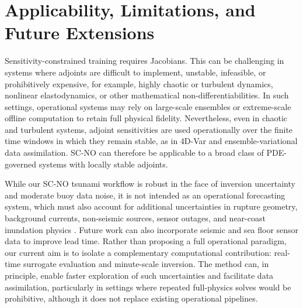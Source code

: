\section{Applicability, Limitations, and Future Extensions}

\renewcommand{\thefigure}{F.\arabic{figure}}  %
\renewcommand{\thetable}{f.\arabic{table}}  %


Sensitivity-constrained training requires Jacobians. This can be challenging in systems where adjoints are difficult to implement, unstable, infeasible, or prohibitively expensive, for example, highly chaotic or turbulent dynamics, nonlinear elastodynamics, or other mathematical non-differentiabilities. In such settings, operational systems may rely on large-scale ensembles or extreme-scale offline computation to retain full physical fidelity. Nevertheless, even in chaotic and turbulent systems, adjoint sensitivities are used operationally over the finite time windows in which they remain stable, as in 4D-Var and ensemble-variational data assimilation. SC-NO can therefore be applicable to a broad class of PDE-governed systems with locally stable adjoints.

While our SC-NO tsunami workflow is robust in the face of inversion uncertainty and moderate buoy data noise, it is not intended as an operational forecasting system, which must also account for additional uncertainties in rupture geometry, background currents, non-seismic sources, sensor outages, and near-coast inundation physics \citep{grezio2017probabilistic}. Future work can also incorporate seismic and sea floor sensor data to improve lead time. Rather than proposing a full operational paradigm, our current aim is to isolate a complementary computational contribution: real-time surrogate evaluation and minute-scale inversion. The method can, in principle, enable faster exploration of such uncertainties and facilitate data assimilation, particularly in settings where repeated full-physics solves would be prohibitive, although it does not replace existing operational pipelines. 

